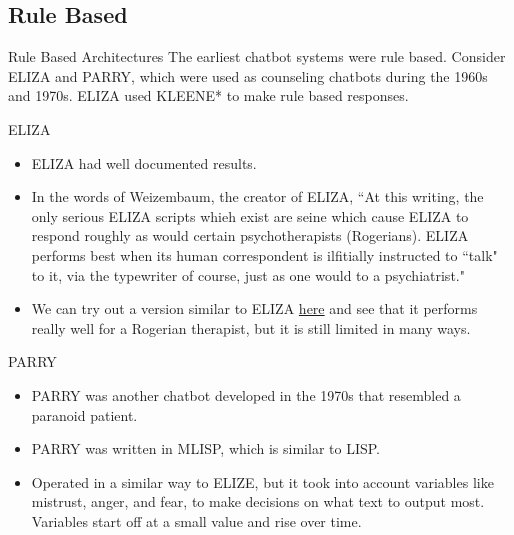 \documentclass[10pt]{beamer}
\begin{document}
\subsection{Rule Based}

\begin{frame}{Rule Based Architectures}
The earliest chatbot systems were rule based.  Consider ELIZA and PARRY, which were used as counseling chatbots during the 1960s and 1970s.  ELIZA used KLEENE* to make rule based responses.  
\end{frame}

\begin{frame}{ELIZA}
\begin{itemize}
    \item ELIZA had well documented results.
    \item In the words of Weizembaum, the creator of ELIZA, ``At this writing, the only serious ELIZA scripts whieh
exist are seine which cause ELIZA to respond roughly as
would certain psychotherapists (Rogerians). ELIZA
performs best when its human correspondent is ilfitially
instructed to ``talk" to it, via the typewriter of course,
just as one would to a psychiatrist." \cite{Weizenbaum1966ELIZAaCP}
    \item We can try out a version similar to ELIZA \href{http://psych.fullerton.edu/mbirnbaum/psych101/eliza.htm}{here} and see that it performs really well for a Rogerian therapist, but it is still limited in many ways. 
\end{itemize}
\end{frame}

\begin{frame}{PARRY}
\begin{itemize}
\item PARRY was another chatbot developed in the 1970s that resembled a paranoid patient.\cite{COLBY19711}
\item PARRY was written in MLISP, which is similar to LISP.
\item Operated in a similar way to ELIZE, but it took into account variables like mistrust, anger, and fear, to make decisions on what text to output most.  Variables start off at a small value and rise over time.
\end{itemize}
\end{frame}
\end{document}
